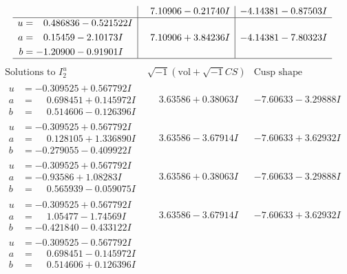 \documentclass[1p]{elsarticle_modified}
\theoremstyle{definition}
\newcommand{\I}{\sqrt{-1}}
\begin{document}
$$\begin{array}{c|c|c}
 & \phantom{-}7.10906 - 0.21740 I & -4.14381 - 0.87503 I \\ \hline\begin{aligned}
u &= \phantom{-}0.486836 - 0.521522 I \\
a &= \phantom{-}0.15459 - 2.10173 I \\
b &= -1.20900 - 0.91901 I\end{aligned}
 & \phantom{-}7.10906 + 3.84236 I & -4.14381 - 7.80323 I\\
 \hline 
 \end{array}$$\newpage$$\begin{array}{c|c|c}  
\text{Solutions to }I^u_{2}& \I (\text{vol} + \sqrt{-1}CS) & \text{Cusp shape}\\
 \hline 
\begin{aligned}
u &= -0.309525 + 0.567792 I \\
a &= \phantom{-}0.698451 + 0.145972 I \\
b &= \phantom{-}0.514606 - 0.126396 I\end{aligned}
 & \phantom{-}3.63586 + 0.38063 I & -7.60633 - 3.29888 I \\ \hline\begin{aligned}
u &= -0.309525 + 0.567792 I \\
a &= \phantom{-}0.128105 + 1.336890 I \\
b &= -0.279055 - 0.409922 I\end{aligned}
 & \phantom{-}3.63586 - 3.67914 I & -7.60633 + 3.62932 I \\ \hline\begin{aligned}
u &= -0.309525 + 0.567792 I \\
a &= -0.93586 + 1.08283 I \\
b &= \phantom{-}0.565939 - 0.059075 I\end{aligned}
 & \phantom{-}3.63586 + 0.38063 I & -7.60633 - 3.29888 I \\ \hline\begin{aligned}
u &= -0.309525 + 0.567792 I \\
a &= \phantom{-}1.05477 - 1.74569 I \\
b &= -0.421840 - 0.433122 I\end{aligned}
 & \phantom{-}3.63586 - 3.67914 I & -7.60633 + 3.62932 I \\ \hline\begin{aligned}
u &= -0.309525 - 0.567792 I \\
a &= \phantom{-}0.698451 - 0.145972 I \\
b &= \phantom{-}0.514606 + 0.126396 I\end{aligned}

\end{array}$$
\end{document}
